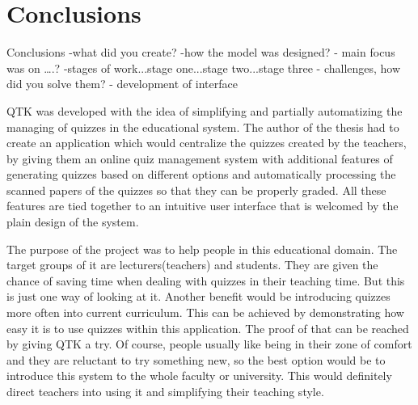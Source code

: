 \section*{Conclusions}

Conclusions
-what did you create? 
-how the model was designed?
- main focus was on ….? 
-stages of work...stage one...stage two...stage three
- challenges, how did you solve them?
- development of interface

QTK was developed with the idea of simplifying and partially automatizing the managing of quizzes in the educational system. The author of the thesis had to create an application which would centralize the quizzes created by the teachers, by giving them an online quiz management system with additional features of generating quizzes based on different options and automatically processing the scanned papers of the quizzes so that they can be properly graded. All these features are tied together to an intuitive user interface that is welcomed by the plain design of the system. 

The purpose of the project was to help people in this educational domain. The target groups of it are lecturers(teachers) and students. They are given the chance of saving time when dealing with quizzes in their teaching time. But this is just one way of looking at it. Another benefit would be introducing quizzes more often into current curriculum. This can be achieved by demonstrating how easy it is to use quizzes within this application. The proof of that can be reached by giving QTK a try. Of course, people usually like being in their zone of comfort and they are reluctant to try something new, so the best option would be to introduce this system to the whole faculty or university. This would definitely direct teachers into using it and simplifying their teaching style.

